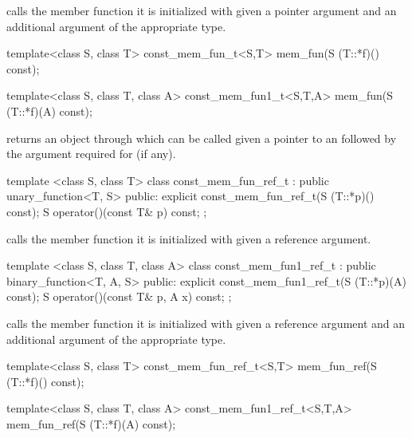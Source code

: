 \begin{itemdescr}
\pnum
{} calls the member function it is initialized with
given a pointer argument and an additional argument of the appropriate type.
\end{itemdescr}

%
\begin{itemdecl}
  template<class S, class T> const_mem_fun_t<S,T>
     mem_fun(S (T::*f)() const);

  template<class S, class T, class A> const_mem_fun1_t<S,T,A>
     mem_fun(S (T::*f)(A) const);
\end{itemdecl}

\begin{itemdescr}
\pnum
{} returns an object through which  can be
called given a pointer to an  followed by the argument required for
 (if any).
\end{itemdescr}

%
\begin{itemdecl}
  template <class S, class T> class const_mem_fun_ref_t
        : public unary_function<T, S> {
  public:
    explicit const_mem_fun_ref_t(S (T::*p)() const);
    S operator()(const T& p) const;
};
\end{itemdecl}

\begin{itemdescr}
\pnum
{} calls the member function it is initialized with
given a reference argument.
\end{itemdescr}

%
\begin{itemdecl}
  template <class S, class T, class A> class const_mem_fun1_ref_t
        : public binary_function<T, A, S> {
  public:
    explicit const_mem_fun1_ref_t(S (T::*p)(A) const);
    S operator()(const T& p, A x) const;
};
\end{itemdecl}

\begin{itemdescr}
\pnum
{} calls the member function it is initialized
with given a reference argument and an additional argument of the appropriate
type.
\end{itemdescr}

%
\begin{itemdecl}
  template<class S, class T> const_mem_fun_ref_t<S,T>
     mem_fun_ref(S (T::*f)() const);

  template<class S, class T, class A> const_mem_fun1_ref_t<S,T,A>
      mem_fun_ref(S (T::*f)(A) const);
\end{itemdecl}

